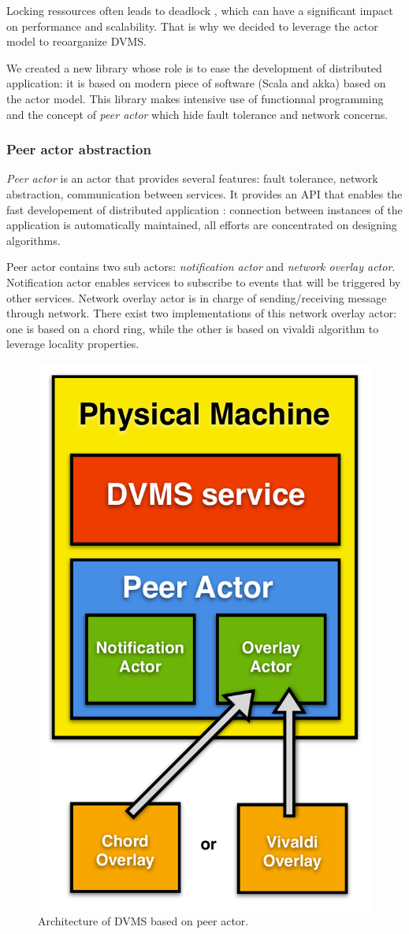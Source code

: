 Locking ressources often leads to deadlock \cite{agha:1986}, which can have
a significant impact on performance and scalability. That is why we decided to
leverage the actor model to reoarganize DVMS.

We created a new library whose role is to ease the development of distributed
application: it is based on modern piece of software (Scala and akka) based on
the actor model. This library makes intensive use of functionnal programming 
and the concept of \emph{peer actor} which hide fault tolerance and network
concerns.

\subsubsection{Peer actor abstraction}

\emph{Peer actor} is an actor that provides several features: fault tolerance,
network abstraction, communication between services. It provides an API that 
enables the fast developement of distributed application : connection between
instances of the application is automatically maintained, all efforts are 
concentrated on designing algorithms.

Peer actor contains two sub actors: \emph{notification actor} and \emph{network
overlay actor}. Notification actor enables services to subscribe to events that
will be triggered by other services. Network overlay actor is in charge of 
sending/receiving message through network. There exist two implementations of 
this network overlay actor: one is based on a chord ring, while the other is 
based on vivaldi algorithm to leverage locality properties.

\begin{figure}[h!]
  \centering
  \includegraphics[width=0.5\linewidth]{Figures/DVMS.pdf}
  \caption{Architecture of DVMS based on peer actor.}%
  \label{fig:isp}%
\end{figure}

